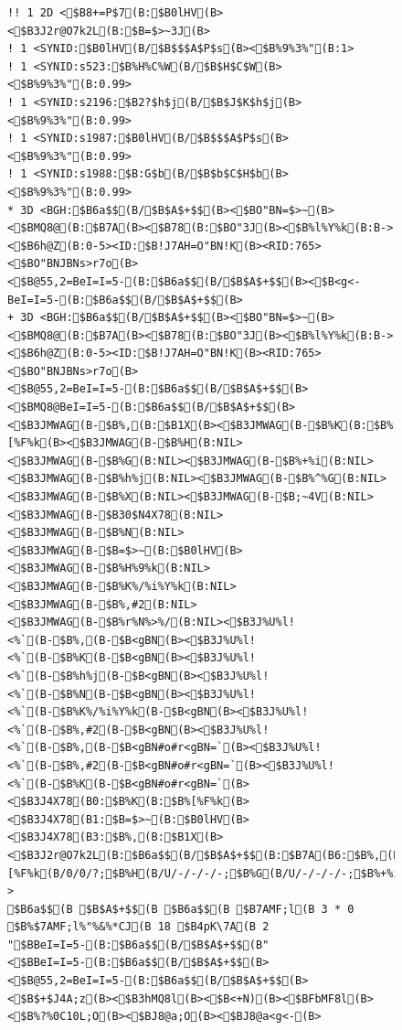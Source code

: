\documentclass[a4j]{jarticle}
\begin{document}
{{{{{{{{{\begin{figure}[t]
\begin{center}
\begin{minipage}{\hsize}
\begin{verbatim}
!! 1 2D <$B8+=P$7(B:$B0lHV(B><$B3J2r@O7k2L(B:$B=$>~3J(B>
! 1 <SYNID:$B0lHV(B/$B$$$A$P$s(B><$B%9%3%"(B:1>
! 1 <SYNID:s523:$B%H%C%W(B/$B$H$C$W(B><$B%9%3%"(B:0.99>
! 1 <SYNID:s2196:$B2?$h$j(B/$B$J$K$h$j(B><$B%9%3%"(B:0.99>
! 1 <SYNID:s1987:$B0lHV(B/$B$$$A$P$s(B><$B%9%3%"(B:0.99>
! 1 <SYNID:s1988:$B:G$b(B/$B$b$C$H$b(B><$B%9%3%"(B:0.99>
* 3D <BGH:$B6a$$(B/$B$A$+$$(B><$BO"BN=$>~(B><$BMQ8@(B:$B7A(B><$B78(B:$BO"3J(B><$B%l%Y%k(B:B-><$B6h@Z(B:0-5><ID:$B!J7AH=O"BN!K(B><RID:765><$BO"BNJBNs>r7o(B><$B@55,2=BeI=I=5-(B:$B6a$$(B/$B$A$+$$(B><$B<g<-BeI=I=5-(B:$B6a$$(B/$B$A$+$$(B>
+ 3D <BGH:$B6a$$(B/$B$A$+$$(B><$BO"BN=$>~(B><$BMQ8@(B:$B7A(B><$B78(B:$BO"3J(B><$B%l%Y%k(B:B-><$B6h@Z(B:0-5><ID:$B!J7AH=O"BN!K(B><RID:765><$BO"BNJBNs>r7o(B><$B@55,2=BeI=I=5-(B:$B6a$$(B/$B$A$+$$(B><$BMQ8@BeI=I=5-(B:$B6a$$(B/$B$A$+$$(B><$B3JMWAG(B-$B%,(B:$B1X(B><$B3JMWAG(B-$B%K(B:$B%[%F%k(B><$B3JMWAG(B-$B%H(B:NIL><$B3JMWAG(B-$B%G(B:NIL><$B3JMWAG(B-$B%+%i(B:NIL><$B3JMWAG(B-$B%h%j(B:NIL><$B3JMWAG(B-$B%^%G(B:NIL><$B3JMWAG(B-$B%X(B:NIL><$B3JMWAG(B-$B;~4V(B:NIL><$B3JMWAG(B-$B30$N4X78(B:NIL><$B3JMWAG(B-$B%N(B:NIL><$B3JMWAG(B-$B=$>~(B:$B0lHV(B><$B3JMWAG(B-$B%H%9%k(B:NIL><$B3JMWAG(B-$B%K%/%i%Y%k(B:NIL><$B3JMWAG(B-$B%,#2(B:NIL><$B3JMWAG(B-$B%r%N%>%/(B:NIL><$B3J%U%l!<%`(B-$B%,(B-$B<gBN(B><$B3J%U%l!<%`(B-$B%K(B-$B<gBN(B><$B3J%U%l!<%`(B-$B%h%j(B-$B<gBN(B><$B3J%U%l!<%`(B-$B%N(B-$B<gBN(B><$B3J%U%l!<%`(B-$B%K%/%i%Y%k(B-$B<gBN(B><$B3J%U%l!<%`(B-$B%,#2(B-$B<gBN(B><$B3J%U%l!<%`(B-$B%,(B-$B<gBN#o#r<gBN=`(B><$B3J%U%l!<%`(B-$B%,#2(B-$B<gBN#o#r<gBN=`(B><$B3J%U%l!<%`(B-$B%K(B-$B<gBN#o#r<gBN=`(B><$B3J4X78(B0:$B%K(B:$B%[%F%k(B><$B3J4X78(B1:$B=$>~(B:$B0lHV(B><$B3J4X78(B3:$B%,(B:$B1X(B><$B3J2r@O7k2L(B:$B6a$$(B/$B$A$+$$(B:$B7A(B6:$B%,(B/N/$B1X(B/3/0/?;$B%K(B/C/$B%[%F%k(B/0/0/?;$B%H(B/U/-/-/-/-;$B%G(B/U/-/-/-/-;$B%+%i(B/U/-/-/-/-;$B%h%j(B/U/-/-/-/-;$B%^%G(B/U/-/-/-/-;$B%X(B/U/-/-/-/-;$B;~4V(B/U/-/-/-/-;$B30$N4X78(B/U/-/-/-/-;$B%N(B/U/-/-/-/-;$B=$>~(B/C/$B0lHV(B/1/0/?;$B%H%9%k(B/U/-/-/-/-;$B%K%/%i%Y%k(B/U/-/-/-/-;$B%,#2(B/U/-/-/-/-;$B%r%N%>%/(B/U/-/-/-/->
$B6a$$(B $B$A$+$$(B $B6a$$(B $B7AMF;l(B 3 * 0 $B%$7AMF;l%"%&%*CJ(B 18 $B4pK\7A(B 2 "$BBeI=I=5-(B:$B6a$$(B/$B$A$+$$(B" <$BBeI=I=5-(B:$B6a$$(B/$B$A$+$$(B><$B@55,2=BeI=I=5-(B:$B6a$$(B/$B$A$+$$(B><$B$+$J4A;z(B><$B3hMQ8l(B><$B<+N)(B><$BFbMF8l(B><$B%?%0C10L;O(B><$BJ8@a;O(B><$BJ8@a<g<-(B>

\end{verbatim}
\end{minipage}
\end{center}
\end{figure}}}}}}}}}}
\end{document}

